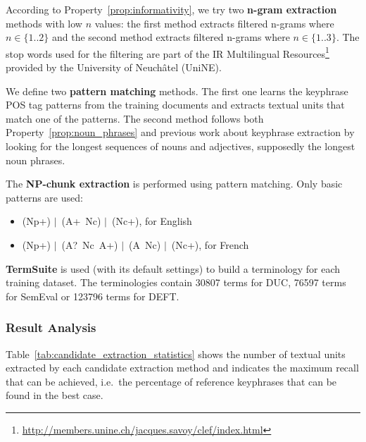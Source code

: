       According to Property~\ref{prop:informativity}, we try two \textbf{n-gram
      extraction} methods with low $n$ values: the first method extracts
      filtered n-grams where $n \in \{1..2\}$ and the second method extracts
      filtered n-grams where $n \in \{1..3\}$. The stop words used for the
      filtering are part of the IR Multilingual
      Resources\footnote{\url{http://members.unine.ch/jacques.savoy/clef/index.html}}
      provided by the University of Neuchâtel (UniNE).

      We define two \textbf{pattern matching} methods. The first one learns the
      keyphrase POS tag patterns from the training documents and extracts
      textual units that match one of the patterns. The second method follows
      both Property~\ref{prop:noun_phrases} and previous work about keyphrase
      extraction by looking for the longest sequences of nouns and adjectives,
      supposedly the longest noun phrases.

      The \textbf{NP-chunk extraction} is performed using pattern matching. Only
      basic patterns are used:
      \begin{itemize}
        \item{(Np+) $|$~(A+~Nc) $|$~(Nc+), for English}
        \item{(Np+) $|$~(A?~Nc~A+) $|$~(A~Nc) $|$~(Nc+),
              for French}
      \end{itemize}


      \textbf{TermSuite} is used (with its default settings) to build a
      terminology for each training dataset. The terminologies contain 30807
      terms for DUC, 76597 terms for SemEval or 123796 terms for DEFT.

    \subsubsection{Result Analysis}
    \label{subsubsec:candidate_extraction_result_analysis}
      Table~\ref{tab:candidate_extraction_statistics} shows the number of
      textual units extracted by each candidate extraction method and indicates
      the maximum recall that can be achieved, i.e.~the percentage of reference
      keyphrases that can be found in the best case.

